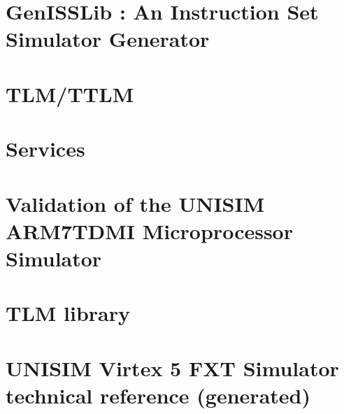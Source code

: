 \documentclass[a4paper,11pt,onecolumn]{mathese}
\begin{document}
\chapter{GenISSLib : An Instruction Set Simulator Generator}
\label{genisslib}


\chapter{TLM/TTLM}
\label{tlm_ttlm}


\chapter{Services}
\label{services}


\chapter{Validation of the UNISIM ARM7TDMI Microprocessor Simulator}
\label{arm7tdmi_validation}


\begin{appendix}
\chapter{TLM library}
\label{tlm_appendix}


\chapter{UNISIM Virtex 5 FXT Simulator technical reference (generated) }
\label{techref}

\end{appendix}

% 
%  




%
%
\end{document}
